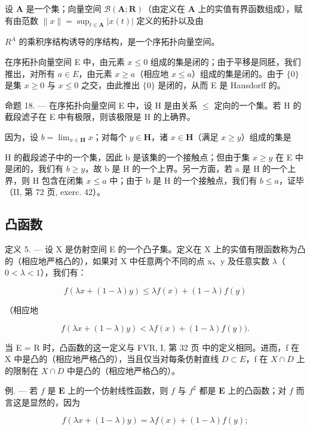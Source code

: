 设 \(\mathbf{A}\) 是一个集；向量空间 \(\mathcal{B}(\mathbf{A};\mathbf{R})\)（由定义在 \(\mathbf{A}\) 上的实值有界函数组成），赋有由范数 \(\| x\| = \sup_{t\in \mathbf{A}}|x(t)|\) 定义的拓扑以及由

\(R^{A}\) 的乘积序结构诱导的序结构，是一个序拓扑向量空间。

在序拓扑向量空间 E 中，由元素 \(x \leqslant 0\) 组成的集是闭的；由于平移是同胚，我们推出，对所有 \(a \in E\)，由元素 \(x \geqslant a\)（相应地 \(x \leqslant a\)）组成的集是闭的。由于 \(\{0\}\) 是集 \(x \geqslant 0\) 与 \(x \leqslant 0\) 之交，由此推出 \(\{0\}\) 是闭的，从而 E 是 Hausdorff 的。

命题 18. --- 在序拓扑向量空间 E 中，设 H 是由关系 \(\leqslant\) 定向的一个集。若 H 的截段滤子在 E 中有极限，则该极限是 H 的上确界。

因为，设 \(b = \lim_{x\in \mathbf{H}}x\)；对每个 \(y\in \mathbf{H}\)，诸 \(x\in \mathbf{H}\)（满足 \(x\geqslant y\)）组成的集是

H 的截段滤子中的一个集，因此 b 是该集的一个接触点；但由于集 \(x \geqslant y\) 在 E 中是闭的，我们有 \(b \geqslant y\)，故 b 是 H 的一个上界。另一方面，若 a 是 H 的一个上界，则 H 包含在闭集 \(x \leqslant a\) 中；由于 b 是 H 的一个接触点，我们有 \(b \leqslant a\)，证毕（II, 第 72 页, exerc. 42）。

\subsection{凸函数}

定义 5. --- 设 X 是仿射空间 E 的一个凸子集。定义在 X 上的实值有限函数称为凸的（相应地严格凸的），如果对 X 中任意两个不同的点 x、y 及任意实数 \(\lambda\)（\(0 < \lambda < 1\)），我们有：

\[
f (\lambda x + (1 - \lambda) y) \leqslant \lambda f (x) + (1 - \lambda) f (y)\tag{1}
\]

（相应地

\[
f (\lambda x + (1 - \lambda) y) <   \lambda f (x) + (1 - \lambda) f (y)).\tag{2}
\]

当 E = R 时，凸函数的这一定义与 FVR, I, 第 32 页 中的定义相同。进而，f 在 X 中是凸的（相应地严格凸的），当且仅当对每条仿射直线 \(D \subset E\)，f 在 \(X \cap D\) 上的限制在 \(X \cap D\) 中是凸的（相应地严格凸的）。

例. --- 若 \(f\) 是 \(\mathbf{E}\) 上的一个仿射线性函数，则 \(f\) 与 \(f^2\) 都是 \(\mathbf{E}\) 上的凸函数；对 \(f\) 而言这是显然的，因为

\[
f (\lambda x + (1 - \lambda) y) = \lambda f (x) + (1 - \lambda) f (y);
\]

